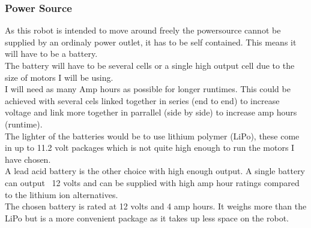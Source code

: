 \documentclass[11pt,fleqn,twoside]{article}
\begin{document}
\subsubsection{Power Source}
As this robot is intended to move around freely the powersource cannot be supplied by an ordinaly power outlet, it has to be self contained.  This means it will have to be a battery.
\\The battery will have to be several cells or a single high output cell due to the size of motors I will be using.
\\I will need as many Amp hours as possible for longer runtimes.  This could be achieved with several cels linked together in series (end to end) to increase voltage and link more together in parrallel (side by side) to increase amp hours (runtime).
\\The lighter of the batteries would be to use lithium polymer (LiPo), these come in up to 11.2 volt packages which is not quite high enough to run the motors I have chosen.
\\A lead acid battery is the other choice with high enough output.  A single battery can output ~12 volts and can be supplied with high amp hour ratings compared to the lithium ion alternatives.
\\The chosen battery is rated at 12 volts and 4 amp hours.  It weighs more than the LiPo but is a more convenient package as it takes up less space on the robot.
\end{document}
